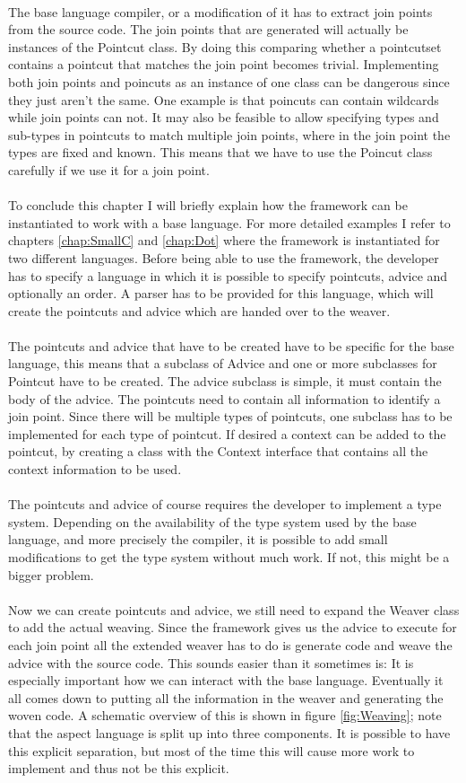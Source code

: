 \documentclass[a4paper]{report}
\begin{document}
\\
The base language compiler, or a modification of it has to extract join points from the source code. The join points that are generated will actually be instances of the Pointcut class. By doing this comparing whether a pointcutset contains a pointcut that matches the join point becomes trivial. Implementing both join points and poincuts as an instance of one class can be dangerous since they just aren't the same. One example is that poincuts can contain wildcards while join points can not. It may also be feasible to allow specifying types and sub-types in pointcuts to match multiple join points, where in the join point the types are fixed and known. This means that we have to use the Poincut class carefully if we use it for a join point.\\
\\
To conclude this chapter I will briefly explain how the framework can be instantiated to work with a base language. For more detailed examples I refer to chapters \ref{chap:SmallC} and \ref{chap:Dot} where the framework is instantiated for two different languages. Before being able to use the framework, the developer has to specify a language in which it is possible to specify pointcuts, advice and optionally an order. A parser has to be provided for this language, which will create the pointcuts and advice which are handed over to the weaver.\\
\\
The pointcuts and advice that have to be created have to be specific for the base language, this means that a subclass of Advice and one or more subclasses for Pointcut have to be created. The advice subclass is simple, it must contain the body of the advice. The pointcuts need to contain all information to identify a join point. Since there will be multiple types of pointcuts, one subclass has to be implemented for each type of pointcut. If desired a context can be added to the pointcut, by creating a class with the Context interface that contains all the context information to be used.\\
\\
The pointcuts and advice of course requires the developer to implement a type system. Depending on the availability of the type system used by the base language, and more precisely the compiler, it is possible to add small modifications to get the type system without much work. If not, this might be a bigger problem.\\
\\
Now we can create pointcuts and advice, we still need to expand the Weaver class to add the actual weaving. Since the framework gives us the advice to execute for each join point all the extended weaver has to do is generate code and weave the advice with the source code. This sounds easier than it sometimes is: It is especially important how we can interact with the base language. Eventually it all comes down to putting all the information in the weaver and generating the woven code. A schematic overview of this is shown in figure \ref{fig:Weaving}; note that the aspect language is split up into three components. It is possible to have this explicit separation, but most of the time this will cause more work to implement and thus not be this explicit.
\end{document}
